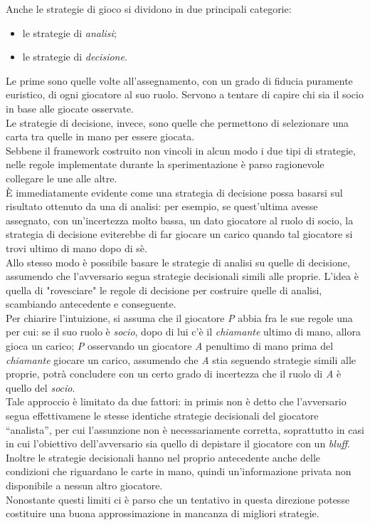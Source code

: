 Anche le strategie di gioco si dividono in due principali categorie:
\begin{itemize}
   \item le strategie di \emph{analisi};
   \item le strategie di \emph{decisione}.
\end{itemize}
Le prime sono quelle volte all'assegnamento, con un grado di fiducia puramente euristico, di ogni giocatore al suo ruolo.
Servono a tentare di capire chi sia il socio in base alle giocate osservate.\\
Le strategie di decisione, invece, sono quelle che permettono di selezionare una carta tra quelle in mano per essere giocata.\\
Sebbene il framework costruito non vincoli in alcun modo i due tipi di strategie, nelle regole implementate durante la sperimentazione  è parso ragionevole collegare le une alle altre.\\
È immediatamente evidente come una strategia di decisione possa basarsi sul risultato ottenuto da una di analisi: per esempio, se quest'ultima avesse assegnato, con un'incertezza molto bassa, un dato giocatore al ruolo di socio, la strategia di decisione eviterebbe di far giocare un carico quando tal giocatore si trovi ultimo di mano dopo di sè.\\

Allo stesso modo è possibile basare le strategie di analisi su quelle di decisione, assumendo che l'avversario segua strategie decisionali simili alle proprie.
L'idea è quella di "rovesciare" le regole di decisione per costruire quelle di analisi, scambiando antecedente e conseguente.\\
Per chiarire l'intuizione, si assuma che il giocatore \emph{P} abbia fra le sue regole una per cui: se il suo ruolo è \emph{socio}, dopo di lui c'è il \emph{chiamante} ultimo di mano, allora gioca un carico; \emph{P} osservando un giocatore \emph{A} penultimo di mano prima del \emph{chiamante} giocare un carico, assumendo che \emph{A} stia seguendo strategie simili alle proprie, potrà concludere con un certo grado di incertezza che il ruolo di \emph{A} è quello del \emph{socio}.\\
Tale approccio è limitato da due fattori: in primis non è detto che l'avversario segua effettivamene le stesse identiche strategie decisionali del giocatore ``analista'', per cui l'assunzione non è necessariamente corretta, soprattutto in casi in cui l'obiettivo dell'avversario sia quello di depistare il giocatore con un \emph{bluff}.\\
Inoltre le strategie decisionali hanno nel proprio antecedente anche delle condizioni che riguardano le carte in mano, quindi un'informazione privata non disponibile a nessun altro giocatore.\\
Nonostante questi limiti ci è parso che un tentativo in questa direzione potesse costituire una buona approssimazione in mancanza di migliori strategie.\\




